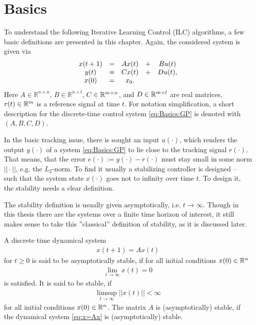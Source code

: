 \chapter{Basics} 
\label{ch:Basics}

To understand the following Iterative Learning Control (ILC) algorithms, a few basic definitions are presented in this chapter. 
Again, the considered system is given via 
\begin{align}
\label{eq:Basics:GP}
\begin{split}
&\begin{array}{c c c c c}
x(t+1) &= &A x(t)& + &B u(t)  \\
y ( t) &= &C x(t)&  + &D u(t),\\ 
x(0)& = &x_0. & &
\end{array}\\
\end{split}
\end{align}
 Here $A \in \mathbb{R}^{n\times n}$, $B \in \mathbb{R}^{n \times l}$, $C \in {\mathbb{R}}^{m \times n}$, and $D \in {\mathbb{R}}^{m\times l}$ are real matrices, $r(t) \in {\mathbb{R}}^{m}$ is a reference signal at time $t$. For notation simplification, a short description for the discrete-time control system \eqref{eq:Basics:GP} is denoted with $(A, B,C,D)$. 

In the basic tracking issue, there is sought an input $u(\cdot)$, which renders the output $y(\cdot)$ of a system \eqref{eq:Basics:GP} to lie close to the tracking signal $r(\cdot)$. That means, that the error $e(\cdot):= y(\cdot) - r(\cdot)$ must stay small in some norm  $||\cdot||$, e.g. the $L_2$-norm. To find it usually a stabilizing controller is designed -- such that the system state $x(\cdot)$ goes not to infinity over time $t$. 
To design it, the stability needs a clear definition. 

The stability definition is usually given asymptotically, i.e. $t \to \infty$. Though in this thesis there are the systems over a finite time horizon of interest, it still makes sense to take this ''classical'' definition of stability, as it is discussed later.  

\begin{defi}
	A discrete time dynamical system
	\begin{align}
	\label{eq:x=Ax}
	x(t+1) = A x(t)
	\end{align}
	for $t \geq 0$ 
	is said to be asymptotically stable, if for all initial conditions $x(0) \in {\mathbb{R}}^n$
	\begin{align}
	\lim_{t \to \infty} x(t) = 0
	\end{align}	
    is satisfied. 
	It is said to be stable, if 
	\begin{align}
	\limsup_{t \to \infty} ||x(t)|| < \infty
	\end{align}
	for all	 initial conditions $x(0) \in {\mathbb{R}}^n$.
	The matrix $A$ is (asymptotically) stable, if the dynamical system \eqref{eq:x=Ax} is (asymptotically) stable.
\end{defi}



